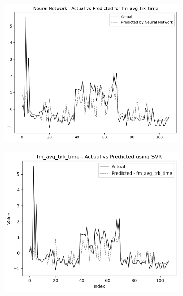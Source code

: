 \begin{figure}\hfill
    \centering
    \begin{subfigure}[b]{0.49\textwidth}
        \centering
        \includegraphics[width=\textwidth]{images/nnCharts/all_data_fine_motor_avg_tracking_time.png}
    \end{subfigure}\hfill
    \begin{subfigure}[b]{0.49\textwidth}
        \centering
        \includegraphics[width=\textwidth]{images/regressionCharts/all_data_fine_motor_tracking_time.png}
       
    \end{subfigure}
    

\end{figure}
